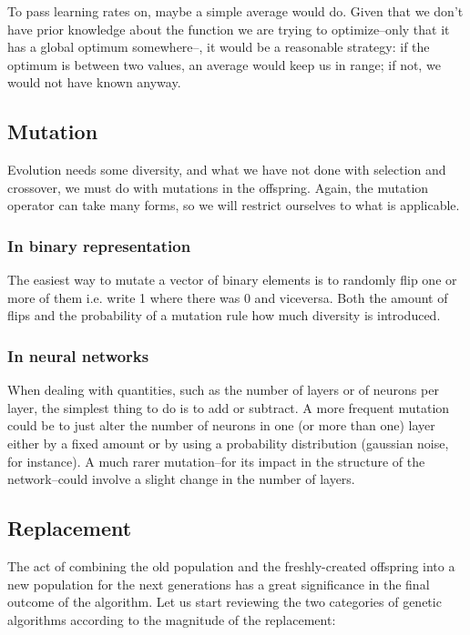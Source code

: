 			To pass learning rates on, maybe a simple average would do. Given that we don't have prior knowledge about the function we are trying to optimize--only that it has a global optimum somewhere--, it would be a reasonable strategy: if the optimum is between two values, an average would keep us in range; if not, we would not have known anyway.

\newpage

	\subsection{Mutation}

		Evolution needs some diversity, and what we have not done with selection and crossover, we must do with mutations in the offspring.
		Again, the mutation operator can take many forms, so we will restrict ourselves to what is applicable.

		\subsubsection{In binary representation}

			The easiest way to mutate a vector of binary elements is to randomly flip one or more of them i.e. write 1 where there was 0 and viceversa. Both the amount of flips and the probability of a mutation rule how much diversity is introduced.

		\subsubsection{In neural networks}

			When dealing with quantities, such as the number of layers or of neurons per layer, the simplest thing to do is to add or subtract. A more frequent mutation could be to just alter the number of neurons in one (or more than one) layer either by a fixed amount or by using a probability distribution (gaussian noise, for instance). A much rarer mutation--for its impact in the structure of the network--could involve a slight change in the number of layers.


	\subsection{Replacement}

		The act of combining the old population and the freshly-created offspring into a new population for the next generations has a great significance in the final outcome of the algorithm. Let us start reviewing the two categories of genetic algorithms according to the magnitude of the replacement:

